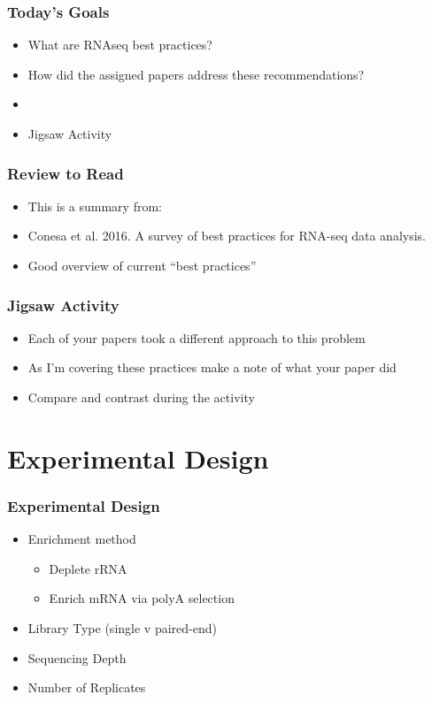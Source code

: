 \documentclass[14pt]{beamer}
\begin{document}
\begin{frame}
\frametitle{Today's Goals}
\begin{itemize}
	\item<+-> What are RNAseq best practices?
	\item<+-> How did the assigned papers address these recommendations?
	\item[]
	\item<+-> Jigsaw Activity
\end{itemize}
\end{frame}

\begin{frame}
\frametitle{Review to Read}
\begin{itemize}
	\item<+-> This is a summary from:
	\item<+-> Conesa et al. 2016. A survey of best practices for RNA-seq data analysis.
	\item<+-> Good overview of current ``best practices''
\end{itemize}
\end{frame}

\begin{frame}
\frametitle{Jigsaw Activity}
\begin{itemize}
	\item<+-> Each of your papers took a different approach to this problem
	\item<+-> As I'm covering these practices make a note of what your paper did
	\item<+-> Compare and contrast during the activity
\end{itemize}
\end{frame}

\section{Experimental Design}
\begin{frame}
\frametitle{Experimental Design}
\begin{itemize}
	\item<+-> Enrichment method
	\begin{itemize}
		\item<+-> Deplete rRNA 
		\item<+-> Enrich mRNA via polyA selection
	\end{itemize}
	\item<+-> Library Type (single v paired-end)
	\item<+-> Sequencing Depth
	\item<+-> Number of Replicates
\end{itemize}
\end{frame}
\end{document}
